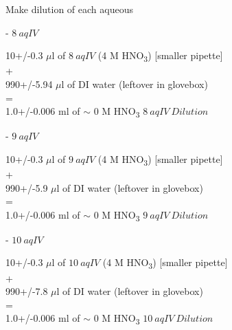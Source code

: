 \documentclass[idxtotoc,hyperref,openany,oneside]{labbook} %
\newcommand{\cmark}{\ding{51}}%
\newcommand{\done}{\rlap{$\square$}{\raisebox{2pt}{\large\hspace{1pt}\cmark}}%
  \hspace{-2.5pt}}
\newcommand{\tsbs}{\textsubscript}
\begin{document}
\begin{todolist}
\item[\done]{Make dilution of each aqueous}
  \begin{todolist}
  \item[\done]{- $\boxed{8\ aqIV}$}
  \end{todolist}
  \begin{center}
    10+/-0.3 $\mu$l of $\boxed{8\ aqIV}$
    (4 M HNO\tsbs{3}) [smaller pipette]\\
    +\\
    990+/-5.94 $\mu$l of DI water (leftover in glovebox)\\
    =\\
    1.0+/-0.006 ml of $\sim$
    0 M HNO\tsbs{3} $\boxed{8\ aqIV\ Dilution}$
  \end{center}
  \begin{todolist}
  \item[\done]{- $\boxed{9\ aqIV}$}
  \end{todolist}
  \begin{center}
    10+/-0.3 $\mu$l of $\boxed{9\ aqIV}$
    (4 M HNO\tsbs{3}) [smaller pipette]\\
    +\\
    990+/-5.9 $\mu$l of DI water (leftover in glovebox)\\
    =\\
    1.0+/-0.006 ml of $\sim$
    0 M HNO\tsbs{3} $\boxed{9\ aqIV\ Dilution}$
  \end{center}
  \begin{todolist}
  \item[\done]{- $\boxed{10\ aqIV}$}
  \end{todolist}
  \begin{center}
    10+/-0.3 $\mu$l of $\boxed{10\ aqIV}$
    (4 M HNO\tsbs{3}) [smaller pipette]\\
    +\\
    990+/-7.8 $\mu$l of DI water (leftover in glovebox)\\
    =\\
    1.0+/-0.006 ml of $\sim$
    0 M HNO\tsbs{3} $\boxed{10\ aqIV\ Dilution}$
  \end{center}


\end{todolist}
\end{document}
